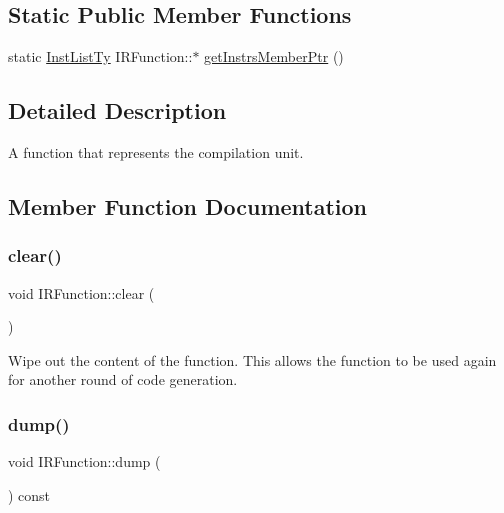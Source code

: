 \subsection*{Static Public Member Functions}
\begin{DoxyCompactItemize}
\item 
static \hyperlink{classglow_1_1_tagged_list}{Inst\+List\+Ty} I\+R\+Function\+::$\ast$ \hyperlink{classglow_1_1_i_r_function_a18e37ad4e8852cdb792335ff64c8239c}{get\+Instrs\+Member\+Ptr} ()
\end{DoxyCompactItemize}


\subsection{Detailed Description}
A function that represents the compilation unit. 

\subsection{Member Function Documentation}
\mbox{\label{classglow_1_1_i_r_function_ae55c9c317c085a417b8e814fed07d16e}} 
\subsubsection{\texorpdfstring{clear()}{clear()}}
{\footnotesize\ttfamily void I\+R\+Function\+::clear (\begin{DoxyParamCaption}{ }\end{DoxyParamCaption})}

Wipe out the content of the function. This allows the function to be used again for another round of code generation. \mbox{\label{classglow_1_1_i_r_function_ac3d4b9c36b9ef614759bd355e20eedb6}} 
\subsubsection{\texorpdfstring{dump()}{dump()}\hspace{0.1cm}{\footnotesize\ttfamily [1/2]}}
{\footnotesize\ttfamily void I\+R\+Function\+::dump (\begin{DoxyParamCaption}{ }\end{DoxyParamCaption}) const}

